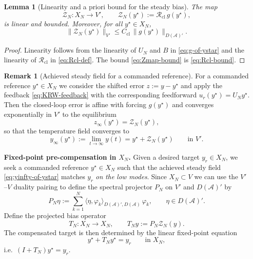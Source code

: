 \documentclass[11pt,a4paper]{article}
\numberwithin{equation}{section}
\newtheorem{lemma}[theorem]{Lemma}
\theoremstyle{definition}
\newtheorem{remark}[theorem]{Remark}
\newcommand{\1}{\mathbbm{1}}
\begin{document}
\begin{lemma}[Linearity and a priori bound for the steady bias]
\label{lem:bias-map}
The map
\begin{equation}
\label{eq:Zmap-def}
\mathcal{Z}_N:X_N\to V',\qquad
\mathcal{Z}_N(y^\star):=\mathcal{R}_{\mathrm{cl}}\,g(y^\star),
\end{equation}
is linear and bounded. Moreover, for all $y^\star\in X_N$,
\begin{equation}
\label{eq:Zmap-bound}
\|\mathcal{Z}_N(y^\star)\|_{V'} \le C_{\mathrm{cl}}\,\|g(y^\star)\|_{D(\mathcal A)'}.
\end{equation}
\end{lemma}

\begin{proof}
Linearity follows from the linearity of $U_N$ and $B$ in \eqref{eq:g-of-ystar} and the linearity of
$\mathcal{R}_{\mathrm{cl}}$ in \eqref{eq:Rcl-def}. The bound \eqref{eq:Zmap-bound} is \eqref{eq:Rcl-bound}.
\end{proof}

\begin{remark}[Achieved steady field for a commanded reference]
\label{rem:achieved-steady-field}
For a commanded reference $y^\star\in X_N$ we consider the shifted error $z:=y-y^\star$ and apply the
feedback \eqref{eq:KRW-feedback} with the corresponding feedforward $u_r(y^\star)=U_Ny^\star$.
Then the closed-loop error is affine with forcing $g(y^\star)$ and converges exponentially in $V'$ to the equilibrium
\[
z_\infty(y^\star)=\mathcal{Z}_N(y^\star),
\]
so that the temperature field converges to
\begin{equation}
\label{eq:yinfty-of-ystar}
y_\infty(y^\star):=\lim_{t\to\infty} y(t) = y^\star + \mathcal{Z}_N(y^\star)\qquad \text{in }V'.
\end{equation}
\end{remark}

\medskip
\noindent\textbf{Fixed-point pre-compensation in $X_N$.}
Given a desired target $y_r\in X_N$, we seek a commanded reference $y^\star\in X_N$ such that the achieved
steady field \eqref{eq:yinfty-of-ystar} matches $y_r$ \emph{on the low modes}. Since $X_N\subset V$ we can use the
$V'$--$V$ duality pairing to define the spectral projector $P_N$ on $V'$ and $D(\mathcal A)'$ by
\[
P_N \eta := \sum_{k=1}^N \langle \eta,\varphi_k\rangle_{D(\mathcal A)',D(\mathcal A)}\,\varphi_k,
\qquad \eta\in D(\mathcal A)'.
\]
Define the projected bias operator
\begin{equation}
\label{eq:TN-def}
T_N:X_N\to X_N,\qquad T_N y := P_N \mathcal{Z}_N(y).
\end{equation}
The compensated target is then determined by the linear fixed-point equation
\begin{equation}
\label{eq:fixed-point}
y^\star + T_N y^\star = y_r\qquad\text{in }X_N,
\end{equation}
i.e.\ $(I+T_N)y^\star=y_r$.
\end{document}
